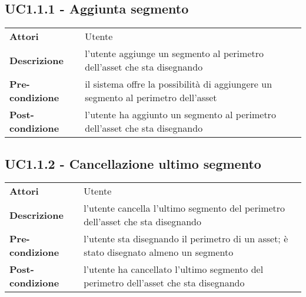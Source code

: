 \subsection{UC1.1.1 - Aggiunta segmento}
\label{sssec:UC1.1.1}
\def\arraystretch{1.5}
\begin{tabularx}{\textwidth}{l|p{}}
\rowcolor{I} \multicolumn{2}{c}{\color{white}\textbf{UC1.1.1 - Aggiunta segmento}} \\
\toprule
\endhead
\textbf{Attori} & Utente\\
\textbf{Descrizione} & l'utente aggiunge un segmento al perimetro dell'asset che sta disegnando\\
\textbf{Pre-condizione} & il sistema offre la possibilità di aggiungere un segmento al perimetro dell'asset\\
\textbf{Post-condizione} & l'utente ha aggiunto un segmento al perimetro dell'asset che sta disegnando\\
\bottomrule
\end{tabularx}
\subsection{UC1.1.2 - Cancellazione ultimo segmento}
\label{sssec:UC1.1.2}
\def\arraystretch{1.5}
\begin{tabularx}{\textwidth}{l|p{}}
\rowcolor{I} \multicolumn{2}{c}{\color{white}\textbf{UC1.1.2 - Cancellazione ultimo segmento}} \\
\toprule
\endhead
\textbf{Attori} & Utente\\
\textbf{Descrizione} & l'utente cancella l'ultimo segmento del perimetro dell'asset che sta disegnando\\
\textbf{Pre-condizione} & l'utente sta disegnando il perimetro di un asset; è stato disegnato almeno un segmento\\
\textbf{Post-condizione} & l'utente ha cancellato l'ultimo segmento del perimetro dell'asset che sta disegnando\\
\bottomrule
\end{tabularx}
